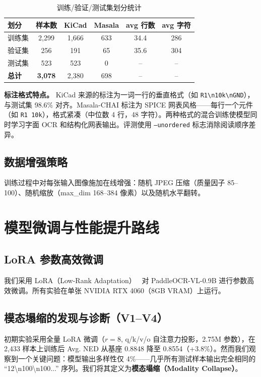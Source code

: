 \begin{table}[h]
\centering
\caption{训练/验证/测试集划分统计}
\label{tab:split}
\begin{tabular}{lccccc}
\toprule
\textbf{划分} & \textbf{样本数} & \textbf{KiCad} & \textbf{Masala} & \textbf{avg 行数} & \textbf{avg 字符} \\
\midrule
训练集 & 2,299 & 1,666 & 633 & 34.4 & 286 \\
验证集 & 256   & 191  & 65  & 35.6 & 304 \\
测试集 & 523   & 523  & 0   & --   & -- \\
\midrule
\textbf{总计} & \textbf{3,078} & 2,380 & 698 & -- & -- \\
\bottomrule
\end{tabular}
\end{table}

\textbf{标注格式特点。} KiCad 来源的标注为一词一行的垂直格式（如 \texttt{R1\textbackslash n10k\textbackslash nGND}），与测试集 98.6\% 对齐。Masala-CHAI 标注为 SPICE 网表风格——每行一个元件（如 \texttt{R1 10k}），格式紧凑（中位数 4 行，48 字符）。两种格式的混合训练使模型同时学习字面 OCR 和结构化网表输出。评测使用 \texttt{--unordered} 标志消除阅读顺序差异。

\subsection{数据增强策略}
训练过程中对每张输入图像施加在线增强：随机 JPEG 压缩（质量因子 85--100）、随机缩放（max\_dim 168--384 像素）以及随机水平翻转。


\section{模型微调与性能提升路线}

\subsection{LoRA 参数高效微调}

我们采用 LoRA（Low-Rank Adaptation）~\citep{hu2021lora} 对 PaddleOCR-VL-0.9B 进行参数高效微调。所有实验在单张 NVIDIA RTX 4060（8GB VRAM）上运行。

\subsection{模态塌缩的发现与诊断（V1--V4）}

初期实验采用全量 LoRA 微调（$r=8$, q/k/v/o 自注意力投影，2.75M 参数），在 2,433 样本上训练后 Avg. NED 从基座 0.8848 降至 0.8554（+3.8\%）。然而我们观察到一个关键问题：模型输出多样性仅 4\%——几乎所有测试样本输出完全相同的 ``12\textbackslash n100\textbackslash n100...'' 序列。我们将其定义为\textbf{模态塌缩（Modality Collapse）}。

